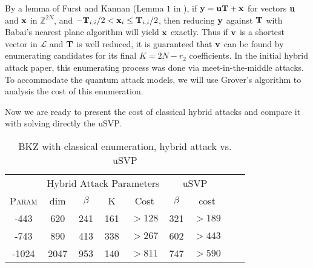 \documentclass{llncs}
\newcommand{\Lcal}{{\mathcal L}}
\newcommand{\ZZ}{\mathbb{Z}}
\newcommand{\bfu}{{\bf u}}
\newcommand{\bfv}{{\bf v}}
\newcommand{\bfx}{{\bf x}}
\newcommand{\bfy}{{\bf y}}
\newcommand{\bfT}{{\bf T}}
\newcommand{\ntru}{{\sf{NTRU}}}
\newcommand{\<}{\langle}
\renewcommand{\>}{\rangle}
\begin{document}
By a lemma of Furst and Kannan (Lemma $1$ in \cite{Nick07}), if $\bfy = \bfu\bfT + \bfx$
for vectors $\bfu$ and $\bfx$ in $\ZZ^{2N}$, and $-\bfT_{i,i}/2 < \bfx_i \le \bfT_{i,i}/2$,
then reducing $\bfy$ against $\bfT$ with Babai's nearest plane algorithm will yield
$\bfx$ exactly. Thus if $\bfv$ is a shortest vector in $\Lcal$ and $\bfT$ is well reduced, it is guaranteed that $\bfv$ can be found by enumerating
candidates for its final $K = 2N-r_2$ coefficients. 
In the initial hybrid attack paper, 
this enumerating 
process  
was done via meet-in-the-middle attacks. To accommodate the quantum
attack models, we will use Grover's algorithm to analysis the cost
of this enumeration.

Now we are ready to present the cost of classical hybrid
attacks and compare it with solving directly the uSVP. 


\begin{table}%
\centering\caption{BKZ with classical enumeration, hybrid attack vs. uSVP}
\begin{tabular}{|*{9}{c|}}\hline

                                    &   \multicolumn{4}{c|}{Hybrid Attack Parameters}                                        & \multicolumn{2}{c|}{uSVP}  \\\cline{2-7}

 \textsc{Param}            &   dim   & $\beta$    &  K      &   Cost               &    $\beta$ & cost  \\\hline\hline

\ntru-443     &  620   &   241          &    161    &           $>128$ & 321& $>189$\\

\ntru-743     &   890   &   413           &    338    &     $>267$       & 602 &$>443$   \\
\ntru-1024     &   2047   &   953           &    140    &     $>811$     & 747 & $>590$  \\\hline
\end{tabular}
\end{table}
\end{document}
